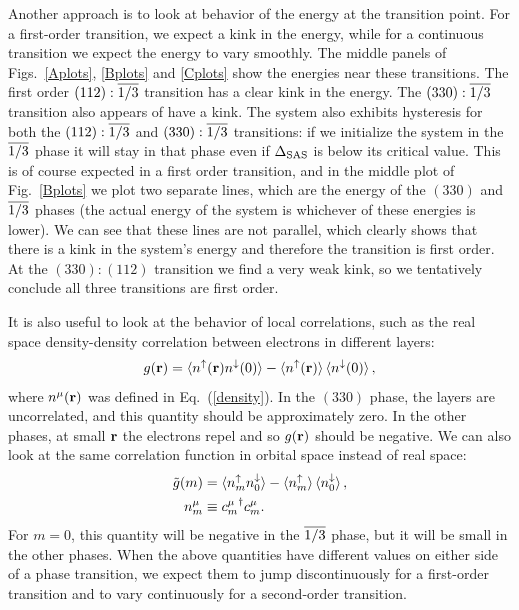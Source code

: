 Another approach is to look at behavior of the energy at the transition point. For a first-order transition, we expect a kink in the energy, while for a continuous transition we expect the energy to vary smoothly. The middle panels of Figs.~\ref{Aplots}, \ref{Bplots} and \ref{Cplots} show the energies near these transitions. 
The first order $(112):\overline{1/3}$ transition has a clear kink in the energy.
The $(330):\overline{1/3}$ transition also appears of have a kink. 
The system also exhibits hysteresis for both the $(112):\overline{1/3}$ and $(330):\overline{1/3}$ transitions: if we initialize the system in the $\overline{1/3}$ phase it will stay in that phase even if $\Delta_\textrm{SAS}$ is below its critical value. 
This is of course expected in a first order transition, and in the middle plot of Fig.~\ref{Bplots} we plot two separate lines, which are the energy of the $(330)$ and $\overline{1/3}$ phases (the actual energy of the system is whichever of these energies is lower). 
We can see that these lines are not parallel, which clearly shows that there is a kink in the system's energy and therefore the transition is first order.
At the $(330):(112)$ transition we find a very weak kink, so we tentatively conclude all three transitions are first order.

It is also useful to look at the behavior of local correlations, such as the real space density-density correlation between electrons in different layers:
\begin{align}
	{g}({\mathbf{r}})=\braket{ n^\uparrow({\mathbf{r}})n^\downarrow(0) } - \braket{n^\uparrow({\mathbf{r}})} \braket{n^\downarrow(0)},
\end{align}
where $n^\mu({\mathbf{r}})$ was defined in Eq.~(\ref{density}).
In the $(330)$ phase, the layers are uncorrelated, and this quantity should be approximately zero. In the other phases, at small ${\mathbf{r}}$ the electrons repel and so ${g}({\mathbf{r}})$ should be negative. We can also look at the same correlation function in orbital space instead of real space:
\begin{align}\begin{split}
	{\tilde g}(m) &= \braket{ n^\uparrow_m n^\downarrow_0 } - \braket{n^\uparrow_m}\braket{n^\downarrow_0}, \\
	n^\mu_m &\equiv {c_m^\mu}^\dagger c^\mu_m.
\end{split}\end{align}
For $m=0$, this quantity will be negative in the $\overline{1/3}$ phase, but it will be small in the other phases. %
When the above quantities have different values on either side of a phase transition, we expect them to jump discontinuously for a first-order transition and to vary continuously for a second-order transition.

